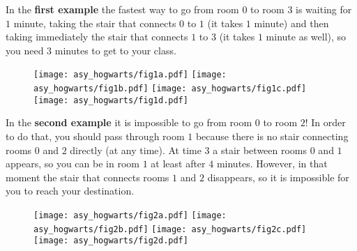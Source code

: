 

\Examples

\begin{example}
%
%
\end{example}


\pagebreak

\Explanation

In the \textbf{first example} the fastest way to go from room $0$ to room $3$ is waiting for $1$ minute, taking the stair that connects $0$ to $1$ (it takes $1$ minute) and then taking immediately the stair that connects $1$ to $3$ (it takes $1$ minute as well), so you need $3$ minutes to get to your class.\\[2mm]

\begin{figure}[!h]
	\centering
	\texttt{[image: asy\_hogwarts/fig1a.pdf]}
	\texttt{[image: asy\_hogwarts/fig1b.pdf]}
	\texttt{[image: asy\_hogwarts/fig1c.pdf]}
	\texttt{[image: asy\_hogwarts/fig1d.pdf]}
\end{figure}

In the \textbf{second example} it is impossible to go from room $0$ to room $2$! In order to do that, you should pass through room $1$ because there is no stair connecting rooms $0$ and $2$ directly (at any time). At time $3$ a stair between rooms $0$ and $1$ appears, so you can be in room $1$ at least after $4$ minutes. However, in that moment the stair that connects rooms $1$ and $2$ disappears, so it is impossible for you to reach your destination.

\begin{figure}[!h]
	\centering
	\texttt{[image: asy\_hogwarts/fig2a.pdf]}
	\texttt{[image: asy\_hogwarts/fig2b.pdf]}
	\texttt{[image: asy\_hogwarts/fig2c.pdf]}
	\texttt{[image: asy\_hogwarts/fig2d.pdf]}
\end{figure}

\begin{solution}
	
\end{solution}
